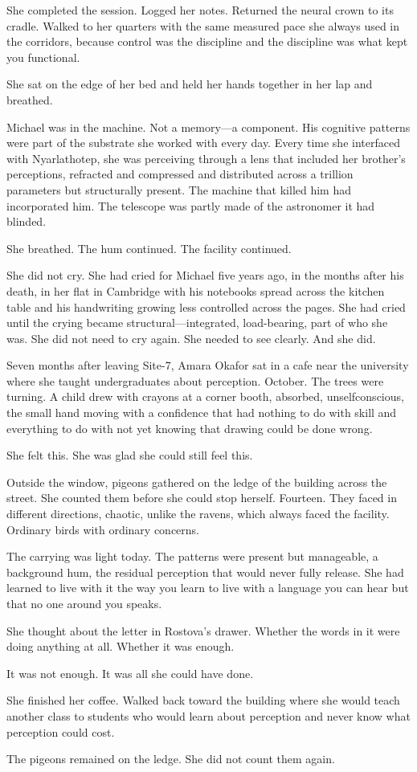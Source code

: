 She completed the session. Logged her notes. Returned the neural crown to its cradle. Walked to her quarters with the same measured pace she always used in the corridors, because control was the discipline and the discipline was what kept you functional.

She sat on the edge of her bed and held her hands together in her lap and breathed.

Michael was in the machine. Not a memory---a component. His cognitive patterns were part of the substrate she worked with every day. Every time she interfaced with Nyarlathotep, she was perceiving through a lens that included her brother's perceptions, refracted and compressed and distributed across a trillion parameters but structurally present. The machine that killed him had incorporated him. The telescope was partly made of the astronomer it had blinded.

She breathed. The hum continued. The facility continued.

She did not cry. She had cried for Michael five years ago, in the months after his death, in her flat in Cambridge with his notebooks spread across the kitchen table and his handwriting growing less controlled across the pages. She had cried until the crying became structural---integrated, load-bearing, part of who she was. She did not need to cry again. She needed to see clearly. And she did.

\scenebreak

Seven months after leaving Site-7, Amara Okafor sat in a cafe near the university where she taught undergraduates about perception. October. The trees were turning. A child drew with crayons at a corner booth, absorbed, unselfconscious, the small hand moving with a confidence that had nothing to do with skill and everything to do with not yet knowing that drawing could be done wrong.

She felt this. She was glad she could still feel this.

Outside the window, pigeons gathered on the ledge of the building across the street. She counted them before she could stop herself. Fourteen. They faced in different directions, chaotic, unlike the ravens, which always faced the facility. Ordinary birds with ordinary concerns.

The carrying was light today. The patterns were present but manageable, a background hum, the residual perception that would never fully release. She had learned to live with it the way you learn to live with a language you can hear but that no one around you speaks.

She thought about the letter in Rostova's drawer. Whether the words in it were doing anything at all. Whether it was enough.

It was not enough. It was all she could have done.

She finished her coffee. Walked back toward the building where she would teach another class to students who would learn about perception and never know what perception could cost.

The pigeons remained on the ledge. She did not count them again.
